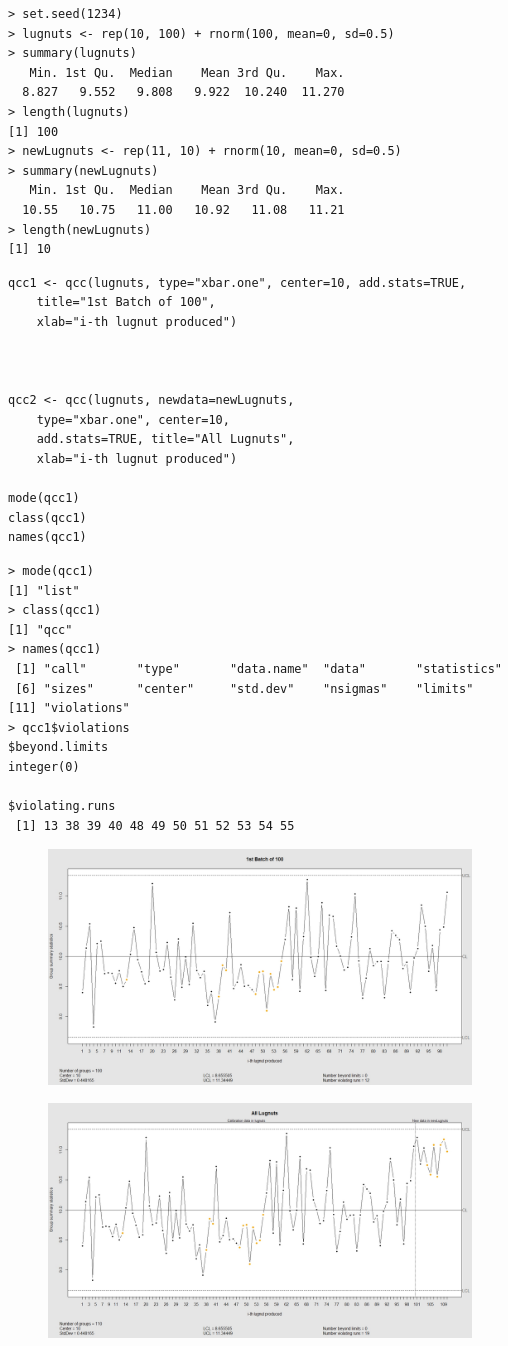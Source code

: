 \documentclass[]{article}
\begin{document}
\begin{verbatim}
> set.seed(1234)
> lugnuts <- rep(10, 100) + rnorm(100, mean=0, sd=0.5)
> summary(lugnuts)
   Min. 1st Qu.  Median    Mean 3rd Qu.    Max. 
  8.827   9.552   9.808   9.922  10.240  11.270 
> length(lugnuts)
[1] 100
> newLugnuts <- rep(11, 10) + rnorm(10, mean=0, sd=0.5)
> summary(newLugnuts)
   Min. 1st Qu.  Median    Mean 3rd Qu.    Max. 
  10.55   10.75   11.00   10.92   11.08   11.21 
> length(newLugnuts)
[1] 10
\end{verbatim}

\begin{framed}
\begin{verbatim}
qcc1 <- qcc(lugnuts, type="xbar.one", center=10, add.stats=TRUE,
    title="1st Batch of 100", 
    xlab="i-th lugnut produced")



qcc2 <- qcc(lugnuts, newdata=newLugnuts,
    type="xbar.one", center=10, 
    add.stats=TRUE, title="All Lugnuts", 
    xlab="i-th lugnut produced")

mode(qcc1)
class(qcc1)
names(qcc1)
\end{verbatim}
\end{framed}

\begin{verbatim}
> mode(qcc1)
[1] "list"
> class(qcc1)
[1] "qcc"
> names(qcc1)
 [1] "call"       "type"       "data.name"  "data"       "statistics"
 [6] "sizes"      "center"     "std.dev"    "nsigmas"    "limits"    
[11] "violations"
> qcc1$violations
$beyond.limits
integer(0)

$violating.runs
 [1] 13 38 39 40 48 49 50 51 52 53 54 55
\end{verbatim}

\newpage
\begin{figure}[h!]
\centering
\includegraphics[width=0.8\linewidth]{./lugnuts1}
\caption{}
\label{fig:lugnuts1}
\end{figure}
\begin{figure}[h!]
\centering
\includegraphics[width=0.8\linewidth]{./lugnuts2}
\caption{}
\label{fig:lugnuts2}
\end{figure}
\newpage
\end{document}
